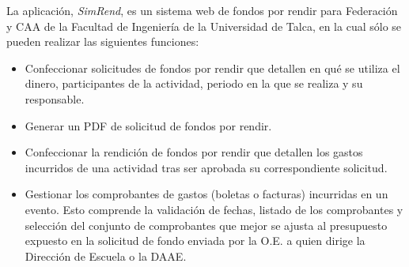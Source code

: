 La aplicación, \emph{SimRend}, es un sistema web de fondos por rendir para Federación y CAA de la Facultad de Ingeniería de la Universidad de Talca, en la cual sólo se pueden realizar las siguientes funciones:

\begin{itemize}
    \item Confeccionar solicitudes de fondos por rendir que detallen en qué se utiliza el dinero, participantes de la actividad, periodo en la que se realiza y su responsable.
    
    \item Generar un PDF de solicitud de fondos por rendir.

    \item Confeccionar la rendición de fondos por rendir que detallen los gastos incurridos de una actividad tras ser aprobada su correspondiente solicitud.
    
    \item Gestionar los comprobantes de gastos (boletas o facturas) incurridas en un evento. Esto comprende la validación de fechas, listado de los comprobantes y selección del conjunto de comprobantes que mejor se ajusta al presupuesto expuesto en la solicitud de fondo enviada por la O.E. a quien dirige la Dirección de Escuela o la DAAE.
    
\end{itemize}